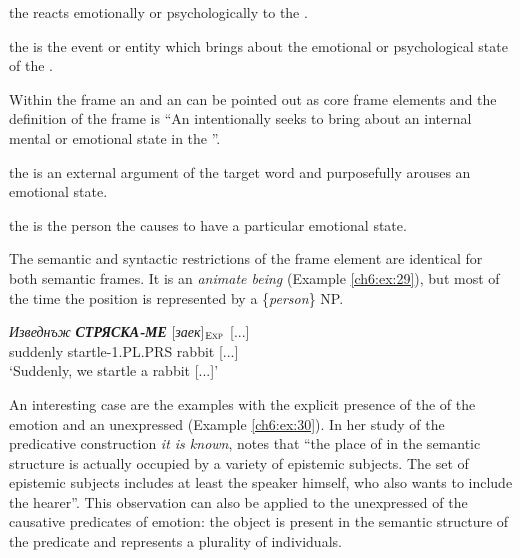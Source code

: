 \documentclass[output=paper,colorlinks,citecolor=brown]{langscibook}
\begin{document}
\begin{description}[font=\normalfont]
\item[\textbf{\fename{Experiencer}}:] the  reacts emotionally or psychologically to the .
\item[\textbf{\fename{Stimulus}}:] the  is the event or entity which brings about the emotional or psychological state of the .
\end{description}

Within the  frame an  and an  can be pointed out as core frame elements and the definition of the frame is ``An  intentionally seeks to bring about an internal mental or emotional state in the ''. 

\begin{description}[font=\normalfont]
\item[\textbf{\fename{Agent}}:] the  is an external argument of the target word and purposefully arouses an emotional state.
\item[\textbf{\fename{Experiencer}}:] the  is the person the  causes to have a particular emotional state.
\end{description}

The semantic and syntactic restrictions of the frame element  are identical for both semantic frames. It is an \textit{animate being} (Example \ref{ch6:ex:29}), but most of the time the position is represented by a \{\textit{person}\} NP.
\begin{exe} 
\ex  \label{ch6:ex:29} 
\gll \textit{Изведнъж} {\textit{\textbf{СТРЯСКА-МЕ}}} [\textit{заек}]$_{\text{\textsc{Exp}}}$ [...] \\ 
{suddenly} {startle-1.PL.PRS} {rabbit} [...]
\\%
\glt `Suddenly, we startle a rabbit [...]'
\end{exe}

An interesting case are the examples with the explicit presence of the  of the emotion and an unexpressed  (Example \ref{ch6:ex:30}). In her study of the predicative construction \textit{it is known}, \citet [175]{ницолова2001значение} notes that ``the place of  in the semantic structure is actually occupied by a variety of epistemic subjects. The set of epistemic subjects includes at least the speaker himself, who also wants to include the hearer''. This observation can also be applied to the unexpressed  of the causative predicates of emotion: the object is present in the semantic structure of the predicate and represents a plurality of individuals.
\end{document}
